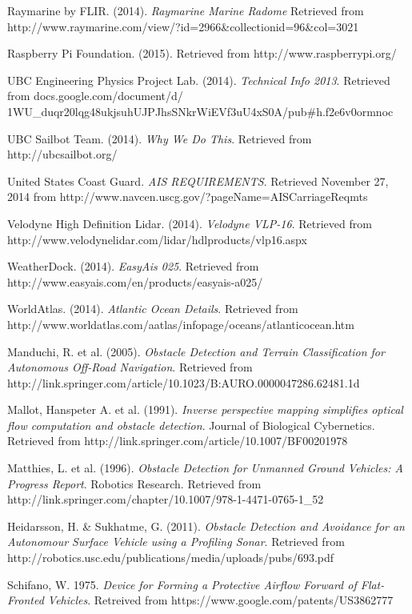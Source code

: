 \begin{thebibliography}{99}
 Raymarine by FLIR. (2014). \textit{Raymarine Marine Radome} Retrieved from http://www.raymarine.com/view/?id=2966\&collectionid=96\&col=3021

 Raspberry Pi Foundation. (2015). Retrieved from http://www.raspberrypi.org/

 UBC Engineering Physics Project Lab. (2014). \textit{Technical Info 2013}. Retrieved from docs.google.com/document/d/\\1WU\_duqr20lqg48ukjsuhUJPJhsSNkrWiEVf3uU4xS0A/pub\#h.f2e6v0ormnoc

 UBC Sailbot Team. (2014). \textit{Why We Do This}. Retrieved from http://ubcsailbot.org/

 United States Coast Guard. \textit{AIS REQUIREMENTS}. Retrieved November 27, 2014 from http://www.navcen.uscg.gov/?pageName=AISCarriageReqmts

 Velodyne High Definition Lidar. (2014). \textit{Velodyne VLP-16}. Retrieved from http://www.velodynelidar.com/lidar/hdlproducts/vlp16.aspx

 WeatherDock. (2014). \textit{EasyAis 025}. Retrieved from http://www.easyais.com/en/products/easyais-a025/

 WorldAtlas. (2014). \textit{Atlantic Ocean Details}. Retrieved from http://www.worldatlas.com/aatlas/infopage/oceans/atlanticocean.htm

 Manduchi, R. et al. (2005). \textit{Obstacle Detection and Terrain Classification for Autonomous Off-Road Navigation}. Retrieved from http://link.springer.com/article/10.1023/B:AURO.0000047286.62481.1d

 Mallot, Hanspeter A. et al. (1991). \textit{Inverse perspective mapping simplifies optical flow computation and obstacle detection}. Journal of Biological Cybernetics. Retrieved from http://link.springer.com/article/10.1007/BF00201978

 Matthies, L. et al. (1996). \textit{Obstacle Detection for Unmanned Ground Vehicles: A Progress Report}. Robotics Research. Retrieved from http://link.springer.com/chapter/10.1007/978-1-4471-0765-1\_52

 Heidarsson, H. \& Sukhatme, G. (2011). \textit{Obstacle Detection and Avoidance for an Autonomour Surface Vehicle using a Profiling Sonar}. Retrieved from http://robotics.usc.edu/publications/media/uploads/pubs/693.pdf

 Schifano, W. {1975}. \textit{Device for Forming a Protective Airflow Forward of Flat-Fronted Vehicles}. Retreived from https://www.google.com/patents/US3862777


\end{thebibliography}